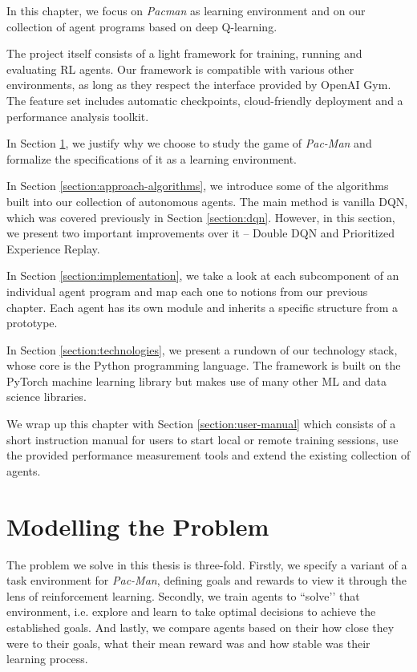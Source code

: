 In this chapter, we focus on \emph{Pacman} as learning environment and on our collection of agent programs based on deep Q-learning.

The project itself consists of a light framework for training, running and evaluating RL agents.
Our framework is compatible with various other environments, as long as they respect the interface provided by OpenAI Gym.
The feature set includes automatic checkpoints, cloud-friendly deployment and a performance analysis toolkit.

In Section \ref{section:modelling-the-problem}, we justify why we choose to study the game of \emph{Pac-Man} and formalize the specifications of it as a learning environment.

In Section \ref{section:approach-algorithms}, we introduce some of the algorithms built into our collection of autonomous agents.
The main method is vanilla DQN, which was covered previously in Section \ref{section:dqn}.
However, in this section, we present two important improvements over it -- Double DQN and Prioritized Experience Replay.

In Section \ref{section:implementation}, we take a look at each subcomponent of an individual agent program and map each one to notions from our previous chapter.
Each agent has its own module and inherits a specific structure from a prototype.

In Section \ref{section:technologies}, we present a rundown of our technology stack, whose core is the Python programming language. The framework is built on the PyTorch machine learning library but makes use of many other ML and data science libraries.

We wrap up this chapter with Section \ref{section:user-manual} which consists of a short instruction manual for users to start local or remote training sessions, use the provided performance measurement tools and extend the existing collection of agents.

\clearpage

\section{Modelling the Problem} \label{section:modelling-the-problem}
The problem we solve in this thesis is three-fold.
Firstly, we specify a variant of a task environment for \emph{Pac-Man}, defining goals and rewards to view it through the lens of reinforcement learning.
Secondly, we train agents to ``solve’’ that environment, i.e. explore and learn to take optimal decisions to achieve the established goals.
And lastly, we compare agents based on their how close they were to their goals, what their mean reward was and how stable was their learning process.


